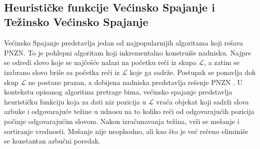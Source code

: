 \documentclass[12pt,oneside]{memoir}
\begin{document}
\\

\subsection{Heurističke funkcije Većinsko Spajanje i Težinsko Većinsko Spajanje}
\label{sec:mmiwmm}
Većinsko Spajanje predstavlja jedan od najpopularnijih algoritama koji rešava PNZN. To je pohlepni algoritam
koji inkrementalno konstruiše nadnisku. Najpre se odredi slovo koje se najčešće nalazi na početku reči
iz skupa $\mathcal{L}$, a zatim se izabrano slovo briše sa početka reči iz $\mathcal{L}$ koje ga sadrže.
Postupak se ponavlja dok skup $\mathcal{L}$ ne postane prazan, a dobijena nadniska
predstavlja rešenje PNZN \cite{ProbabilisticBS}.
U kontekstu opisanog algoritma pretrage bima, većinsko spajanje predstavlja heurističku funkciju
koja za dati niz pozicija u $\mathcal{L}$ vraća objekat koji sadrži slova azbuke i odgovarajuće
težine u udnosu na to koliko reči od odgovarajućih pozicija počinje odgovarajućim slovom.
Nakon izračunavanja težina, vrši se mešanje i sortiranje vrednosti. Mešanje nije neophodno,
ali kao što je već rečeno eliminiše se konstantan azbučni poredak. 
\end{document}
